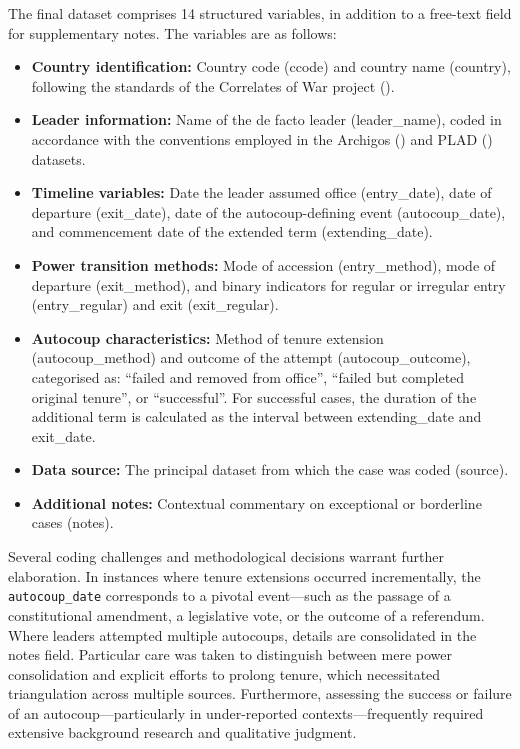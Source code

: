 \documentclass[
  12pt,
]{report}
\begin{document}
The final dataset comprises 14 structured variables, in addition to a
free-text field for supplementary notes. The variables are as follows:

\begin{itemize}
\item
  \textbf{Country identification:} Country code (ccode) and country name
  (country), following the standards of the Correlates of War project
  ().
\item
  \textbf{Leader information:} Name of the de facto leader
  (leader\_name), coded in accordance with the conventions employed in
  the Archigos () and PLAD () datasets.
\item
  \textbf{Timeline variables:} Date the leader assumed office
  (entry\_date), date of departure (exit\_date), date of the
  autocoup-defining event (autocoup\_date), and commencement date of the
  extended term (extending\_date).
\item
  \textbf{Power transition methods:} Mode of accession (entry\_method),
  mode of departure (exit\_method), and binary indicators for regular or
  irregular entry (entry\_regular) and exit (exit\_regular).
\item
  \textbf{Autocoup characteristics:} Method of tenure extension
  (autocoup\_method) and outcome of the attempt (autocoup\_outcome),
  categorised as: ``failed and removed from office'', ``failed but
  completed original tenure'', or ``successful''. For successful cases,
  the duration of the additional term is calculated as the interval
  between extending\_date and exit\_date.
\item
  \textbf{Data source:} The principal dataset from which the case was
  coded (source).
\item
  \textbf{Additional notes:} Contextual commentary on exceptional or
  borderline cases (notes).
\end{itemize}

Several coding challenges and methodological decisions warrant further
elaboration. In instances where tenure extensions occurred
incrementally, the \texttt{autocoup\_date} corresponds to a pivotal
event---such as the passage of a constitutional amendment, a legislative
vote, or the outcome of a referendum. Where leaders attempted multiple
autocoups, details are consolidated in the notes field. Particular care
was taken to distinguish between mere power consolidation and explicit
efforts to prolong tenure, which necessitated triangulation across
multiple sources. Furthermore, assessing the success or failure of an
autocoup---particularly in under-reported contexts---frequently required
extensive background research and qualitative judgment.
\end{document}
